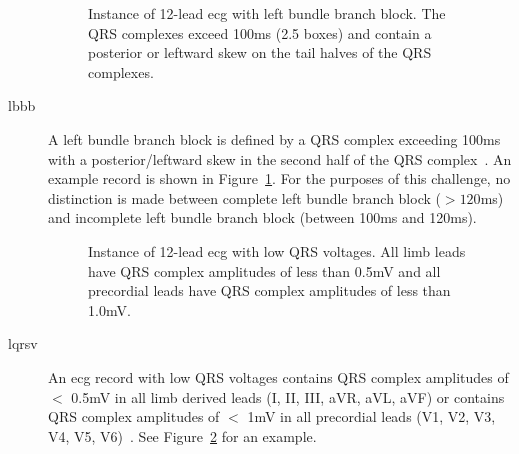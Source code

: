 \documentclass[\main/thesis.tex]{subfiles}
\begin{document}
\begin{description}
    \begin{figure}[ht]
        \centering
        \caption{Instance of 12-lead \gls{ecg} with left bundle branch block. The QRS complexes exceed 100ms (2.5 boxes) and contain a posterior or leftward skew on the tail halves of the QRS complexes.}
        \label{fig:full_LBBB}
    \end{figure}
    \item[\gls{lbbb}] A left bundle branch block is defined by a QRS complex exceeding 100ms with a posterior/leftward skew in the second half of the QRS complex~\cite{ecg-utah-lesson}. An example record is shown in Figure~\ref{fig:full_LBBB}. For the purposes of this challenge, no distinction is made between complete left bundle branch block ($> 120$ms) and incomplete left bundle branch block (between 100ms and 120ms).

    \begin{figure}[ht]
        \centering
        \caption{Instance of 12-lead \gls{ecg} with low QRS voltages. All limb leads have QRS complex amplitudes of less than 0.5mV and all precordial leads have QRS complex amplitudes of less than 1.0mV.}
        \label{fig:full_LQRSV}
    \end{figure}
    \item[\gls{lqrsv}] An \gls{ecg} record with low QRS voltages contains QRS complex amplitudes of $<$ 0.5mV in all limb derived leads (I, II, III, aVR, aVL, aVF) or contains QRS complex amplitudes of $<$ 1mV in all precordial leads (V1, V2, V3, V4, V5, V6)~\cite{madias_low_2008}. See Figure~\ref{fig:full_LQRSV} for an example.


\end{description}
\end{document}
